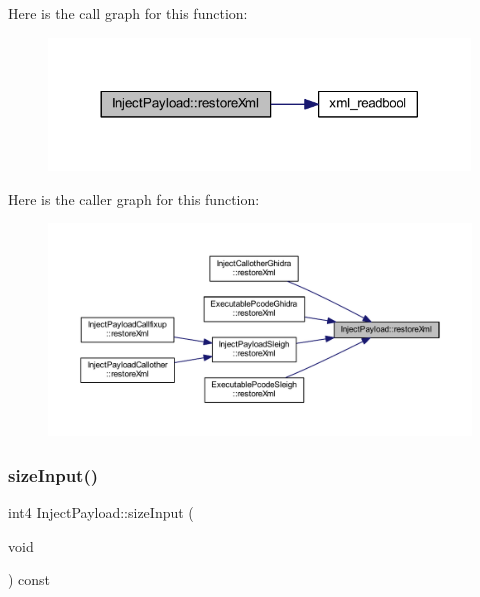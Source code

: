 Here is the call graph for this function\+:
\nopagebreak
\begin{figure}[H]
\begin{center}
\leavevmode
\includegraphics[width=317pt]{class_inject_payload_a19811abba789abc6bc1d3b2322709255_cgraph}
\end{center}
\end{figure}
Here is the caller graph for this function\+:
\nopagebreak
\begin{figure}[H]
\begin{center}
\leavevmode
\includegraphics[width=350pt]{class_inject_payload_a19811abba789abc6bc1d3b2322709255_icgraph}
\end{center}
\end{figure}
\mbox{\label{class_inject_payload_ab617ea269804abb9b752af9f659811e5}} 
\subsubsection{\texorpdfstring{sizeInput()}{sizeInput()}}
{\footnotesize\ttfamily int4 Inject\+Payload\+::size\+Input (\begin{DoxyParamCaption}\item[{void}]{ }\end{DoxyParamCaption}) const\hspace{0.3cm}{\ttfamily [inline]}}



